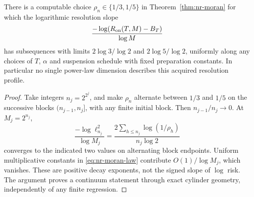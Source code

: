 \begin{corollary}\label{cor:nr-oscillation}
There is a computable choice $\rho_n\in\{1/3,1/5\}$ in Theorem~\ref{thm:nr-moran} for which the logarithmic resolution slope
\[
 \frac{-\log(R_{\mathrm{on}}(T,M)-B_T)}{\log M}
\]
has subsequences with limits $2\log 3/\log2$ and $2\log5/\log2$, uniformly along any choices of $T$, $\alpha$ and suspension schedule with fixed preparation constants. In particular no single power-law dimension describes this acquired resolution profile.
\end{corollary}
\begin{proof}
Take integers $n_j=2^{2^j}$, and make $\rho_n$ alternate between $1/3$ and $1/5$ on the successive blocks $(n_{j-1},n_j]$, with any finite initial block. Then $n_{j-1}/n_j\to0$. At $M_j=2^{n_j}$,
\[
 \frac{-\log\ell_{n_j}^2}{\log M_j}
  =\frac{2\sum_{h\le n_j}\log(1/\rho_h)}{n_j\log2}
\]
converges to the indicated two values on alternating block endpoints. Uniform multiplicative constants in \eqref{eq:nr-moran-law} contribute $O(1)/\log M_j$, which vanishes. These are positive decay exponents, not the signed slope of $\log$ risk. The argument proves a continuum statement through exact cylinder geometry, independently of any finite regression.
\end{proof}

